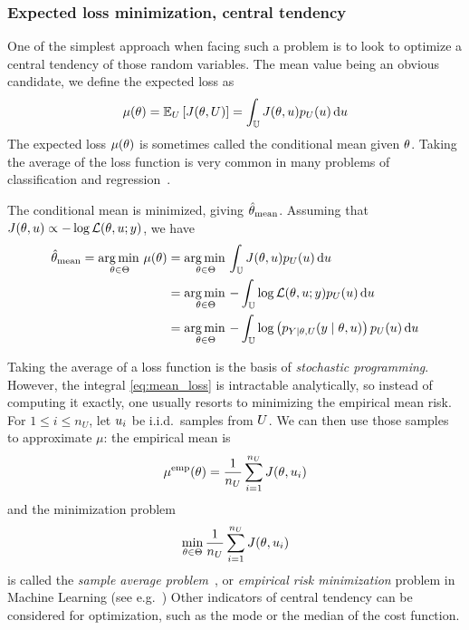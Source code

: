 \documentclass[../../Main_ManuscritThese.tex]{subfiles}
\begin{document}
\subsubsection{Expected loss minimization, central tendency}
\label{sec:exp_loss_minimization}
One of the simplest approach when facing such a problem is to look to optimize a central tendency of those random variables. The mean value being an obvious candidate, we define the expected loss as
\begin{equation}
  \label{eq:mean_loss}
  \mu(\theta) = \mathbb{E}_U\left[J(\theta,U)\right] =\int_{\mathbb{U}} J(\theta,u)p_U(u)\,\mathrm{d}u
\end{equation}
The expected loss $\mu(\theta)$ is sometimes called the conditional mean given $\theta$. Taking the average of the loss function is very common in many problems of classification and regression~\cite{bishop_pattern_2006}.


The conditional mean is minimized, giving $\hat{\theta}_{\mathrm{mean}}$. Assuming that $J(\theta, u) \propto - \log \mathcal{L}(\theta,u;y)$, we have
\begin{align}
  \hat{\theta}_{\mathrm{mean}} = \operatorname*{arg\,min \,}_{\theta\in\Theta} \mu(\theta)&= \operatorname*{arg\,min \,}_{\theta\in\Theta}\int_{\mathbb{U}} J(\theta,u) p_{U}(u)\,\mathrm{d}u \\
                                                            &= \operatorname*{arg\,min \,}_{\theta\in\Theta} - \int_{\mathbb{U}} \log \mathcal{L}(\theta,u;y) p_{U}(u)\,\mathrm{d}u \\
                                                            &= \operatorname*{arg\,min \,}_{\theta\in\Theta} - \int_{\mathbb{U}}\log\left(p_{Y \mid \theta,U}(y \mid \theta,u)\right)p_{U}(u)\,\mathrm{d}u 
\end{align}

Taking the average of a loss function is the basis of \emph{stochastic programming}.
However, the integral \cref{eq:mean_loss} is intractable analytically, so instead of computing it exactly, one usually resorts to minimizing the empirical mean risk. For $1\leq i \leq n_U$, let $u_i$ be i.i.d.\ samples from $U$. We can then use those samples to approximate $\mu$: the empirical mean is
\begin{equation}
  \label{eq:emp_mean_loss}
  \mu^{\mathrm{emp}}(\theta) = \frac{1}{n_U}\sum_{i=1}^{n_U} J(\theta, u_i)
\end{equation}
and the minimization problem
\begin{equation}
  \min_{\theta\in\Theta} \frac{1}{n_U}\sum_{i=1}^{n_U} J(\theta, u_i)
\end{equation}
is called the \emph{sample average problem}~\cite{juditsky_stochastic_2009}, or \emph{empirical risk minimization} problem in Machine Learning (see e.g.~\cite{vapnik_principles_1992})
Other indicators of central tendency can be considered for optimization, such as the mode or the median of the cost function.
\end{document}
